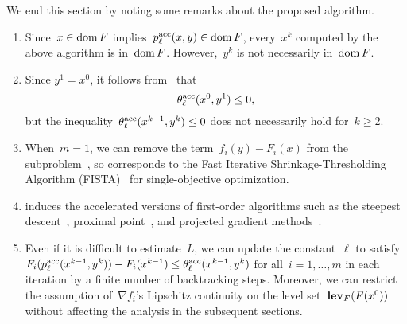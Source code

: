 \documentclass[../main]{subfiles}
\begin{document}
We end this section by noting some remarks about the proposed algorithm.
\begin{remark} 
    \begin{enumerate}
        \item Since~$x \in \operatorname{dom} F$ implies~$p^{\mathrm{acc}}_\ell(x, y) \in \operatorname{dom} F$, every~$x^k$ computed by the above algorithm is in~$\operatorname{dom} F$.
            However,~$y^k$ is not necessarily in~$\operatorname{dom} F$.
        \item Since $y^1 = x^0$, it follows from~ that
            \begin{equation} \label{eq:subprob ineq}
                \theta^{\mathrm{acc}}_\ell(x^0, y^1) \le 0
            ,\end{equation}
            but the inequality~$\theta^{\mathrm{acc}}_\ell(x^{k - 1}, y^k) \le 0$ does not necessarily hold for~$k \ge 2$.
        \item When~$m = 1$, we can remove the term~$f_i(y) - F_i(x)$ from the subproblem~, so  corresponds to the Fast Iterative Shrinkage-Thresholding Algorithm (FISTA)~\cite{Beck2009} for single-objective optimization.
        \item {} induces the accelerated versions of first-order algorithms such as the steepest descent~\cite{Fliege2000}, proximal point~\cite{Bonnel2005}, and projected gradient methods~\cite{Grana-Drummond2004}.
        \item Even if it is difficult to estimate~$L$, we can update the constant~$\ell$ to satisfy~$F_i(p^{\mathrm{acc}}_\ell(x^{k - 1}, y^k)) - F_i(x^{k - 1}) \le \theta^{\mathrm{acc}}_\ell(x^{k - 1}, y^k)$ for all~$i = 1, \dots, m$ in each iteration by a finite number of backtracking steps.
            Moreover, we can restrict the assumption of~$\nabla f_i$'s Lipschitz continuity on the level set~$\operatorname{\mathbf{lev}}_F(F(x^0))$ without affecting the analysis in the subsequent sections.
    \end{enumerate}
\end{remark}
\end{document}
